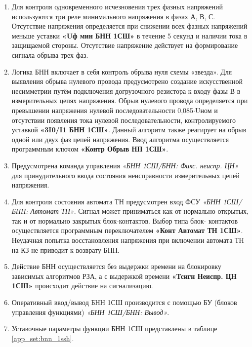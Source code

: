 \begin{enumerate}
\item
Для контроля одновременного исчезновения трех фазных напряжений используются три реле
минимального напряжения в фазах А, В, С. Отсутствие напряжения определяется при снижении всех фазных
напряжений меньше уставки \textbf{«Uф мин БНН 1СШ»} в течение 5 секунд и наличии тока в защищаемой стороны.
Отсутствие напряжение действует на формирование сигнала обрыва трех фаз.

\item
Логика БНН включает в себя контроль обрыва нуля схемы «звезда». Для выявления обрыва нулевого
провода предусмотрено создание искусственной несимметрии путём подключения догрузочного резистора к
входу фазы В в измерительных цепях напряжения. Обрыв нулевого провода определяется при превышении
напряжения нулевой последовательности 0,085$\cdot$Uном и отсутствии появления тока нулевой
последовательности, контролируемого уставкой \textbf{«3I0/I1 БНН 1СШ»}. Данный алгоритм также реагирует на обрыв
одной или двух фаз цепей напряжения. Ввод алгоритма осуществляется программным ключом
\textbf{«Контр Обрыв НП 1СШ»}.

\item 
Предусмотрена команда управления \textit{«БНН 1СШ/БНН: Фикс. неиспр. ЦН»} для принудительного ввода состояния неисправности измерительных цепей напряжения.

\item
Для контроля состояния автомата ТН предусмотрен вход ФСУ \textit{«БНН 1СШ/БНН: Автомат ТН»}. Сигнал может
приниматься как от нормально открытых, так и от нормально закрытых блок-контактов. Выбор типа блок-
контактов осуществляется программным переключателем \textbf{«Конт Автомат ТН 1СШ»}. Неудачная попытка
восстановления напряжения при включении автомата ТН на КЗ не приводит к возврату БНН.

\item
Действие БНН осуществляется без выдержки времени на блокировку зависимых алгоритмов РЗА, а с
выдержкой времени \textbf{«Тсигн Неиспр. ЦН 1СШ»} происходит действие на сигнализацию.

\item
Оперативный ввод/вывод БНН 1СШ производится с помощью БУ (блоков управления функциями) \textit{«БНН 1СШ/БНН: Вывод»}. 

\item
Уставочные параметры функции БНН 1СШ представлены в таблице \ref{app_set:bnn_1ssh}.

\end{enumerate}